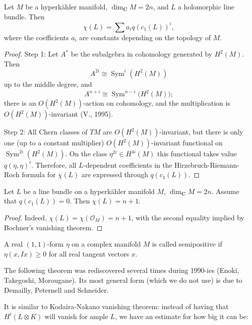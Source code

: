 \begin{theorem}[Huybrechts]
\label{theorem-huybrechts}
Let \(M\) be a hyperk\"ahler manifold,
\(\dim_{\mathbf{C}} M = 2n\), and \(L\) a
holomorphic line bundle. Then
\[
\chi(L)=\sum a_i q(c_1(L))^i,
\]
where the coefficients \(a_i\) are constants
depending on the topology of \(M\).
\end{theorem}

\begin{proof}
Step 1: Let \(A^*\) be the subalgebra in
cohomology generated by \(H^2(M)\). Then
\[
A^{2i} \cong \operatorname{Sym}^i(H^2(M))
\]
up to the middle degree, and
\[
A^{n+i} \cong \operatorname{Sym}^{n-i}
\bigl(H^2(M)\bigr);
\]
there is an \(O(H^2(M))\)-action on
cohomology, and the multiplication is
\(O(H^2(M))\)-invariant (V., 1995).

Step 2: All Chern classes of \(TM\) are
\(O(H^2(M))\)-invariant, but there is only
one (up to a constant multiplier)
\(O(H^2(M))\)-invariant functional on
\(\operatorname{Sym}^{2i}(H^2(M))\). On the
class \(\eta^{2i} \in H^{4i}(M)\) this
functional takes value \(q(\eta,\eta)^i\).
Therefore, all \(L\)-dependent coefficients
in the Hirzebruch-Riemann-Roch formula for
\(\chi(L)\) are expressed through
\(q(c_1(L))\).
\end{proof}

\begin{lemma}[Corollary]
\label{corollary-huybrechts-chi}
Let \(L\) be a line bundle on a hyperk\"ahler
manifold \(M\), \(\dim_{\mathbf{C}} M = 2n\).
Assume that \(q(c_1(L))=0\). Then
\(\chi(L)=n+1\).
\end{lemma}

\begin{proof}
Indeed, \(\chi(L)=\chi(\mathcal{O}_M)=n+1\),
with the second equality implied by
Bochner's vanishing theorem.
\end{proof}

\begin{definition}
\label{definition-semipositive}
A real \((1,1)\)-form \(\eta\) on a complex
manifold \(M\) is called semipositive if
\(\eta(x,Ix)\geq 0\) for all real tangent
vectors \(x\).
\end{definition}

\medskip\noindent
The following theorem was rediscovered
several times during 1990-ies (Enoki,
Takegoshi, Morougane). Its most general form
(which we do not use) is due to Demailly,
Peternell and Schneider.

It is similar to Kodaira-Nakano
vanishing theorem: instead of having that
$H^i(L \otimes K)$ will vanish for ample $L$,
we have an estimate for how big it can be:


